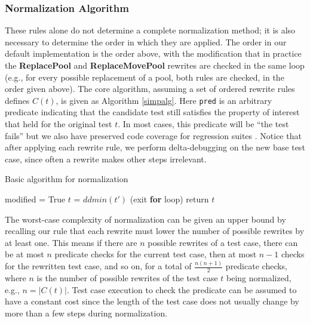 \subsubsection{Normalization Algorithm}

These rules alone do not determine a complete normalization method; it is
also necessary to determine the order in which they are applied.  The
order in our default implementation is the order above, with the
modification that in practice the {\bf ReplacePool} and {\bf
  ReplaceMovePool} rewrites are checked in the same loop
(e.g., for every possible replacement of a pool, both rules are
checked, in the order given above).  The core algorithm, assuming a set
of ordered rewrite rules defines $C(t)$, is given as Algorithm
\ref{simpalg}.  Here {\tt pred} is an arbitrary predicate indicating
that the candidate test still satisfies the property of interest that
held for the original test $t$.  In most cases, this predicate will be
``the test fails'' but we also have preserved
code coverage for regression suites \cite{icst2014}.  Notice that
after applying each rewrite rule, we perform delta-debugging on the
new base test case, since often a rewrite makes other steps irrelevant.

\begin{algorithm}
\caption{Basic algorithm for normalization}
\label{simpalg}
\begin{algorithmic}[1]
\State modified = True 
\State $t$ = $ddmin(t')$
 (exit {\bf for} loop) 
\EndIf 
\EndFor 
\EndWhile 
\State return $t$
\end{algorithmic}
\end{algorithm}

The worst-case complexity of normalization can be given an upper bound by recalling our
rule that each rewrite must lower the number of possible rewrites by
at least one.  This means if there are $n$ possible rewrites of a
test case, there can be at most $n$ predicate checks for the current test case,
then at most $n-1$ checks for the rewritten test case, and so on, for
a total of $\frac{n(n+1)}{2}$ predicate checks, where $n$ is the
number of possible rewrites of the test case $t$ being normalized, e.g.,
$n = |C(t)|$.  Test case execution to check the predicate can be
assumed to have a constant cost since the length of the test case does
not usually change by more than a few steps during normalization. 

